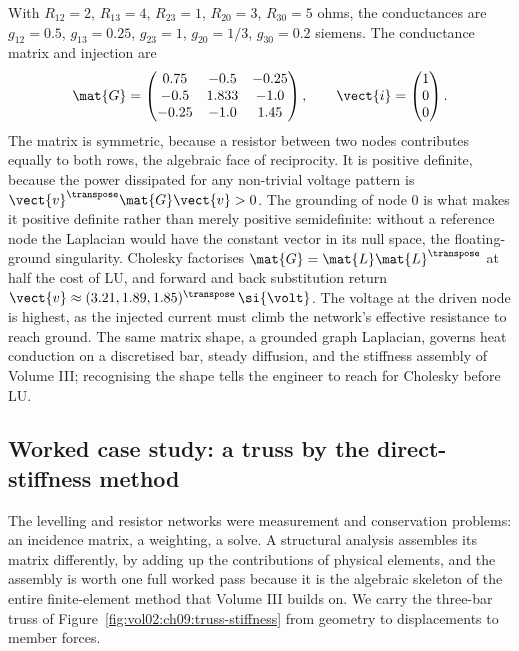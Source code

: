 \begin{example}
With $R_{12} = 2$, $R_{13} = 4$, $R_{23} = 1$, $R_{20} = 3$, $R_{30}
= 5$ ohms, the conductances are $g_{12} = 0.5$, $g_{13} = 0.25$,
$g_{23} = 1$, $g_{20} = 1/3$, $g_{30} = 0.2$ siemens. The conductance
matrix and injection are
\[
\mat{G} = \begin{pmatrix}
0.75 & -0.5 & -0.25 \\
-0.5 & 1.833 & -1.0 \\
-0.25 & -1.0 & 1.45
\end{pmatrix}, \qquad
\vect{i} = \begin{pmatrix} 1 \\ 0 \\ 0 \end{pmatrix}.
\]
The matrix is symmetric, because a resistor between two nodes
contributes equally to both rows, the algebraic face of reciprocity.
It is positive definite, because the power dissipated for any
non-trivial voltage pattern is $\vect{v}^{\transpose}\mat{G}\vect{v}
> 0$. The grounding of node $0$ is what makes it positive definite
rather than merely positive semidefinite: without a reference node
the Laplacian would have the constant vector in its null space, the
floating-ground singularity. Cholesky factorises $\mat{G} =
\mat{L}\mat{L}^{\transpose}$ at half the cost of LU, and forward and
back substitution return $\vect{v} \approx (3.21, 1.89,
1.85)^{\transpose}\,\si{\volt}$. The voltage at the driven node is
highest, as the injected current must climb the network's effective
resistance to reach ground. The same matrix shape, a grounded graph
Laplacian, governs heat conduction on a discretised bar, steady
diffusion, and the stiffness assembly of Volume III; recognising the
shape tells the engineer to reach for Cholesky before LU.
\end{example}

\subsection{Worked case study: a truss by the direct-stiffness method}

The levelling and resistor networks were measurement and conservation
problems: an incidence matrix, a weighting, a solve. A structural
analysis assembles its matrix differently, by adding up the
contributions of physical elements, and the assembly is worth one full
worked pass because it is the algebraic skeleton of the entire
finite-element method that Volume III builds on. We carry the
three-bar truss of Figure~\ref{fig:vol02:ch09:truss-stiffness} from
geometry to displacements to member forces.

